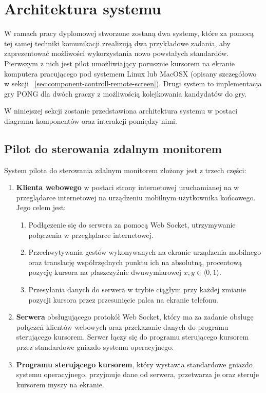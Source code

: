 \section{Architektura systemu}

W ramach pracy dyplomowej stworzone zostaną dwa systemy, które za pomocą tej samej techniki komunikacji zrealizują dwa przykładowe zadania, aby zaprezentować możliwości wykorzystania nowo powstałych standardów. Pierwszym z nich jest pilot umożliwiający porusznie kursorem na ekranie komputera pracującego pod systemem Linux lub MacOSX (opisany szczegółowo w sekcji ~\ref{sec:component-controll-remote-screen}). Drugi system to implementacja gry PONG dla dwóch graczy z możliwością kolejkowania kandydatów do gry.

W niniejszej sekcji zostanie przedstawiona architektura systemu w postaci diagramu komponentów oraz interakcji pomiędzy nimi.

\subsection{Pilot do sterowania zdalnym monitorem}

System pilota do sterowania zdalnym monitorem złożony jest z trzech części:

\begin{enumerate}
  \item \textbf{Klienta webowego} w postaci strony internetowej uruchamianej na w przeglądarce internetowej na urządzeniu mobilnym użytkownika końcowego. Jego celem jest:
  \begin{enumerate}
    \item Podłączenie się do serwera za pomocą Web Socket, utrzymywanie połączenia w przeglądarce internetowej.
    \item Przechwytywania gestów wykonywanych na ekranie urządzenia mobilnego oraz translację współrzędnych punktu ich na absolutną, procentową pozycję kursora na płaszczyźnie dwuwymiarowej \( x, y \in \langle0, 1\rangle \).
    \item Przesyłania danych do serwera w trybie ciągłym przy każdej zmianie pozycji kursora przez przesunięcie palca na ekranie telefonu.
  \end{enumerate}
  
  \item \textbf{Serwera} obsługującego protokół Web Socket, który ma za zadanie obsługę połączeń klientów webowych oraz przekazanie danych do programu sterującego kursorem. Serwer łączy się do programu sterującego kursorem przez standardowe gniazdo systemu operacyjnego.
  \item \textbf{Programu sterującego kursorem}, który wystawia standardowe gniazdo systemu operacyjnego, przyjmuje dane od serwera, przetwarza je oraz steruje kursorem myszy na ekranie.
\end{enumerate}

